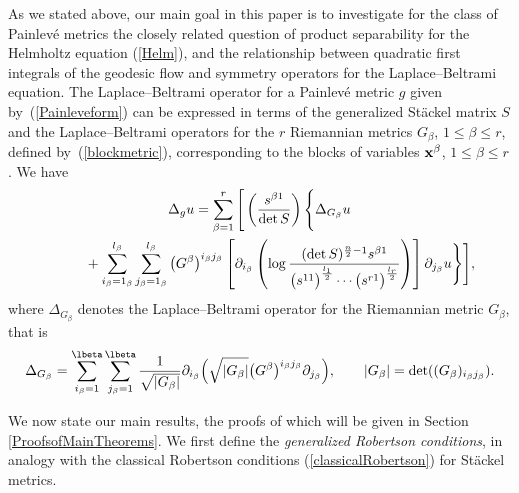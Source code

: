 As we stated above, our main goal in this paper is to investigate for the class of Painlev\'e metrics the closely related question of product separability for the Helmholtz equation (\ref{Helm}), and the relationship between quadratic first integrals of the geodesic flow and symmetry operators for the Laplace--Beltrami equation. The Laplace--Beltrami operator for a Painlev\'e metric $g$ given by~(\ref{Painleveform}) can be expressed in terms of the generalized St\"ackel matrix $S$ and the Laplace--Beltrami operators for the $r$ Riemannian metrics $G_{\beta}$, $1\leq \beta \leq r$, defined by~(\ref{blockmetric}), corresponding to the blocks of variables ${\bf x}^{\beta}$, $1\leq \beta \leq r$. We have
\begin{gather}
\Delta_{g} u =\sum_{\beta=1}^{r}\Bigg[\left(\frac{s^{\beta 1}}{\det S}\right)\Bigg\{\Delta_{G_{\beta}}u\nonumber\\
\hphantom{\Delta_{g} u =}{}+\sum_{i_{\beta}=1_{\beta}}^{l_{\beta}}\sum_{{j}_{\beta}=1_{\beta}}^{l_{\beta}}\big(G^{\beta}\big)^{i_{\beta} j_{\beta}}\left[\partial_{i_{\beta}}\left(\log \frac{(\det S)^{\frac{n}{2}-1}s^{\beta 1}}{\big(s^{11}\big)^{\frac{l_1}{2}} \cdots \big(s^{r1}\big)^{\frac{l_r}{2}}}\right)\right]\partial_{j_{\beta}}u\Bigg\}\Bigg],\label{Laplacian}
\end{gather}
where $\Delta_{G_{\beta}}$ denotes the Laplace--Beltrami operator for the Riemannian metric $G_{\beta}$, that is
\begin{gather*}%
\Delta_{G_{\beta}} = \sum_{i_{\beta}=1}^{\lbeta}\sum_{j_{\beta}=1}^{\lbeta}\frac{1}{\sqrt{|G_{\beta}|}}\partial_{i_{\beta}}\Big(\sqrt{|G_{\beta}|}
\big(G^{\beta}\big)^{i_{\beta}j_{\beta}}\partial_{j_{\beta}}\Big),\qquad |G_{\beta}|=\det((G_{\beta})_{i_{\beta}j_{\beta}}).
\end{gather*}

We now state our main results, the proofs of which will be given in Section \ref{ProofsofMainTheorems}. We first define the \emph{generalized Robertson conditions}, in analogy with the classical Robertson conditions (\ref{classicalRobertson}) for St\"ackel metrics.

